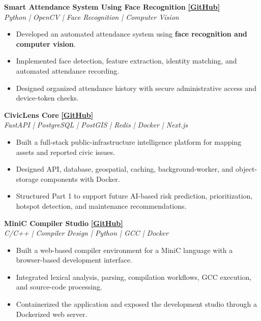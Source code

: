 \documentclass[10pt,a4paper]{article}
\newcommand{\resumeProject}[3]{
    \textbf{#1}
    \hfill
    \href{#3}{\textbf{[GitHub]}}
    \\
    \textit{#2}
    \vspace{1pt}
}
\newcommand{\resumeProjectEnd}{
    \vspace{3pt}
}
\begin{document}
\resumeProject
{Smart Attendance System Using Face Recognition}
{Python | OpenCV | Face Recognition | Computer Vision}
{https://github.com/BijoySarkar19/smart-attendance-system}

\begin{itemize}[leftmargin=14pt, itemsep=1pt, topsep=1pt]
    \item Developed an automated attendance system using \textbf{face recognition and computer vision}.
    \item Implemented face detection, feature extraction, identity matching, and automated attendance recording.
    \item Designed organized attendance history with secure administrative access and device-token checks.
\end{itemize}
\resumeProjectEnd

\resumeProject
{CivicLens Core}
{FastAPI | PostgreSQL | PostGIS | Redis | Docker | Next.js}
{https://github.com/BijoySarkar19/CivicLens-Core}

\begin{itemize}[leftmargin=14pt, itemsep=1pt, topsep=1pt]
    \item Built a full-stack public-infrastructure intelligence platform for mapping assets and reported civic issues.
    \item Designed API, database, geospatial, caching, background-worker, and object-storage components with Docker.
    \item Structured Part 1 to support future AI-based risk prediction, prioritization, hotspot detection, and maintenance recommendations.
\end{itemize}
\resumeProjectEnd

\resumeProject
{MiniC Compiler Studio}
{C/C++ | Compiler Design | Python | GCC | Docker}
{https://github.com/BijoySarkar19/c-compiler-studio}

\begin{itemize}[leftmargin=14pt, itemsep=1pt, topsep=1pt]
    \item Built a web-based compiler environment for a MiniC language with a browser-based development interface.
    \item Integrated lexical analysis, parsing, compilation workflows, GCC execution, and source-code processing.
    \item Containerized the application and exposed the development studio through a Dockerized web server.
\end{itemize}
\resumeProjectEnd
\end{document}
